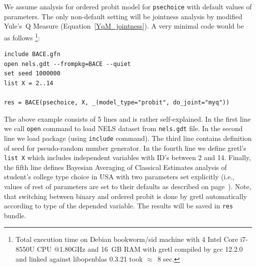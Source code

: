 We assume analysis for ordered probit model for \texttt{psechoice} with
default values of  parameters. The only
non-default setting will be jointness analysis by
modified Yule's~Q Measure (Equation~\ref{YqM_jointness}).
A very minimal code would be as follows%
\footnote{Total execution time on Debian bookworm/sid machine
	with 4 Intel Core i7-8550U CPU @1.80GHz and 16~GB RAM with
	gretl compiled by gcc 12.2.0 and linked against libopenblas
	0.3.21 took $\approx$~8 sec.}:
\begin{lstlisting}
include BACE.gfn
open nels.gdt --frompkg=BACE --quiet
set seed 1000000
list X = 2..14

res = BACE(psechoice, X, _(model_type="probit", do_joint="myq"))
\end{lstlisting}\label{sc:initial_script_example}
The above example consists of 5 lines and is rather
self-explained. In the first line we call
\lstinline!open! command to load NELS dataset from
\texttt{nels.gdt} file. In the second line we load
 package (using \lstinline!include! command).
The third line contains definition of seed for
pseudo-random number generator. In the fourth line
we define gretl's \lstinline!list X! which includes independent
variables with ID's between 2 and 14. Finally, the fifth
line defines Bayesian Averaging of Classical Estimates
analysis of student's college type choice in USA
with two parameters set explicitly (i.e., values of
rest of parameters are set to their defaults as described on
page~\pageref{sec:default_option_bundle}). Note, that
switching between binary and ordered probit is done by
gretl automatically according to type of the depended
variable. The  results will be saved in
\texttt{res} bundle.

